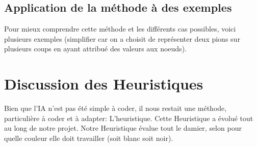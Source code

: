 \documentclass[12,french]{report}
\begin{document}
%
%
%
%
%


\section{Application de la méthode à des exemples}

Pour mieux comprendre cette méthode et les différents cas possibles,
voici plusieurs exemples (simplifier car on a choisit de représenter
deux pions sur plusieurs coups en ayant attribué des valeurs aux noeuds).

\chapter{Discussion des Heuristiques}
Bien que l'IA n'est pas été simple à coder, il nous restait une méthode, particulière à coder et à adapter: L'heuristique.
Cette Heuristique a évolué tout au long de notre projet. 
Notre Heuristique évalue tout le damier, selon pour quelle couleur elle doit travailler (soit blanc soit noir).
\end{document}
